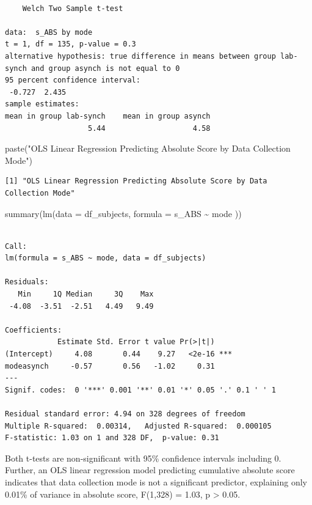 \documentclass[
  letterpaper,
  DIV=11,
  numbers=noendperiod]{scrreprt}
\newenvironment{Shaded}{\begin{snugshade}}{\end{snugshade}}
\newcommand{\AttributeTok}[1]{\textcolor[rgb]{0.40,0.45,0.13}{#1}}
\newcommand{\FunctionTok}[1]{\textcolor[rgb]{0.28,0.35,0.67}{#1}}
\newcommand{\NormalTok}[1]{\textcolor[rgb]{0.00,0.23,0.31}{#1}}
\newcommand{\SpecialCharTok}[1]{\textcolor[rgb]{0.37,0.37,0.37}{#1}}
\newcommand{\StringTok}[1]{\textcolor[rgb]{0.13,0.47,0.30}{#1}}
\begin{document}
\begin{verbatim}

    Welch Two Sample t-test

data:  s_ABS by mode
t = 1, df = 135, p-value = 0.3
alternative hypothesis: true difference in means between group lab-synch and group asynch is not equal to 0
95 percent confidence interval:
 -0.727  2.435
sample estimates:
mean in group lab-synch    mean in group asynch 
                   5.44                    4.58 
\end{verbatim}

\begin{Shaded}
\begin{Highlighting}[]
\FunctionTok{paste}\NormalTok{(}\StringTok{"OLS Linear Regression Predicting Absolute Score by Data Collection Mode"}\NormalTok{)}
\end{Highlighting}
\end{Shaded}

\begin{verbatim}
[1] "OLS Linear Regression Predicting Absolute Score by Data Collection Mode"
\end{verbatim}

\begin{Shaded}
\begin{Highlighting}[]
\FunctionTok{summary}\NormalTok{(}\FunctionTok{lm}\NormalTok{(}\AttributeTok{data =}\NormalTok{ df\_subjects, }\AttributeTok{formula =}\NormalTok{ s\_ABS }\SpecialCharTok{\textasciitilde{}}\NormalTok{ mode ))}
\end{Highlighting}
\end{Shaded}

\begin{verbatim}

Call:
lm(formula = s_ABS ~ mode, data = df_subjects)

Residuals:
   Min     1Q Median     3Q    Max 
 -4.08  -3.51  -2.51   4.49   9.49 

Coefficients:
            Estimate Std. Error t value Pr(>|t|)    
(Intercept)     4.08       0.44    9.27   <2e-16 ***
modeasynch     -0.57       0.56   -1.02     0.31    
---
Signif. codes:  0 '***' 0.001 '**' 0.01 '*' 0.05 '.' 0.1 ' ' 1

Residual standard error: 4.94 on 328 degrees of freedom
Multiple R-squared:  0.00314,   Adjusted R-squared:  0.000105 
F-statistic: 1.03 on 1 and 328 DF,  p-value: 0.31
\end{verbatim}

Both t-tests are non-significant with 95\% confidence intervals
including 0. Further, an OLS linear regression model predicting
cumulative absolute score indicates that data collection mode is not a
significant predictor, explaining only 0.01\% of variance in absolute
score, F(1,328) = 1.03, p \textgreater{} 0.05.
\end{document}
